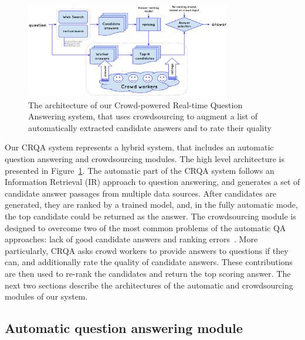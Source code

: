 \documentclass[letterpaper]{article}
\begin{document}
\begin{figure}[h!t]
	\centering
	\includegraphics[width=0.8\textwidth]{img/system}
	\caption{The architecture of our Crowd-powered Real-time Question Answering system, that uses crowdsourcing to augment a list of automatically extracted candidate answers and to rate their quality}
	\label{fig:system}
\end{figure}

Our CRQA system represents a hybrid system, that includes an automatic question answering and crowdsourcing modules.
The high level architecture is presented in Figure~\ref{fig:system}.
The automatic part of the CRQA system follows an Information Retrieval (IR) approach to question answering, and generates a set of candidate answer passages from multiple data sources.
After candidates are generated, they are ranked by a trained model, and, in the fully automatic mode, the top candidate could be returned as the answer.
The crowdsourcing module is designed to overcome two of the most common problems of the automatic QA approaches: lack of good candidate answers and ranking errors~\cite{moldovan2003performance,savenkov_trecliveqa15}.
More particularly, CRQA asks crowd workers to provide answers to questions if they can, and additionally rate the quality of candidate answers.
These contributions are then used to re-rank the candidates and return the top scoring answer.
The next two sections describe the architectures of the automatic and crowdsourcing modules of our system.

\subsection{Automatic question answering module}
\label{sec:system:auto}
\end{document}
